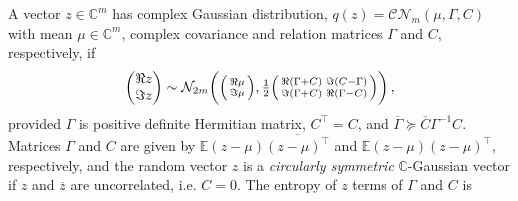 \documentclass{article}
\newcommand{\cplx}{\mathbb{C}}
\newcommand{\conj}[1]{\overline{#1}}
\begin{document}
A vector $z\in \cplx^m$ has complex Gaussian distribution, $
  q(z) = \mathcal{C}\mathcal{N}_m(\mu, \Gamma, C)
$ with mean $\mu \in \cplx^m$, complex covariance and relation matrices $\Gamma$ and $C$,
respectively, if
\begin{equation}  \label{eq:cn-paired-real-density}
  \begin{pmatrix}
    \Re z \\ \Im z
  \end{pmatrix}
    \sim \mathcal{N}_{2 m}\biggl(
      \Bigl(
        \begin{smallmatrix}
          \Re \mu \\ \Im \mu
        \end{smallmatrix}
      \Bigr),
      \tfrac12 \Bigl(
        \begin{smallmatrix}
          \Re{(\Gamma + C)} & \Im{(C - \Gamma)} \\
          \Im{(\Gamma + C)} & \Re{(\Gamma - C)}
        \end{smallmatrix}
      \Bigr)
    \biggr)
    \,,
\end{equation}
provided $\Gamma$ is positive definite Hermitian matrix, $C^\top = C$, and $
  \conj{\Gamma} \succeq \conj{C} \Gamma^{-1} C
$.
%
Matrices $\Gamma$ and $C$ are given by $
  \mathbb{E} (z - \mu)\conj{(z - \mu)^\top}
$ and $
  \mathbb{E} (z - \mu)(z - \mu)^{\top}
$, respectively, and the random vector $z$ is a \emph{circularly symmetric} $\cplx$-Gaussian
vector if $z$ and $\conj{z}$ are uncorrelated, i.e. $C = 0$.
%
The entropy of $z$ terms of $\Gamma$ and $C$ is
\end{document}
